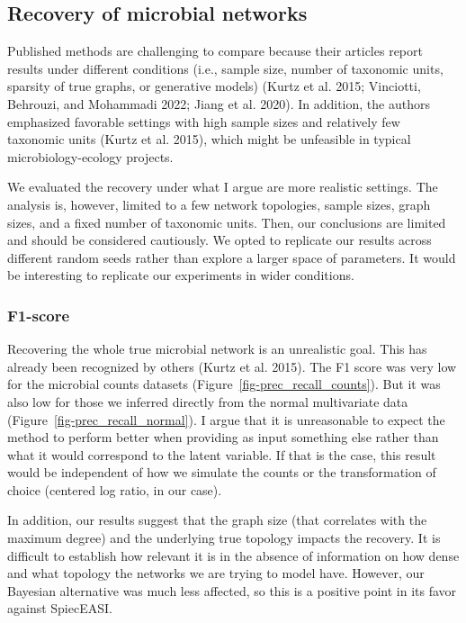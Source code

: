 \documentclass[
  a4paper,
]{article}
\begin{document}
\hypertarget{recovery-of-microbial-networks-1}{%
\subsection{Recovery of microbial
networks}\label{recovery-of-microbial-networks-1}}

Published methods are challenging to compare because their articles
report results under different conditions (i.e., sample size, number of
taxonomic units, sparsity of true graphs, or generative models) (Kurtz
et al. 2015; Vinciotti, Behrouzi, and Mohammadi 2022; Jiang et al.
2020). In addition, the authors emphasized favorable settings with high
sample sizes and relatively few taxonomic units (Kurtz et al. 2015),
which might be unfeasible in typical microbiology-ecology projects.

We evaluated the recovery under what I argue are more realistic
settings. The analysis is, however, limited to a few network topologies,
sample sizes, graph sizes, and a fixed number of taxonomic units. Then,
our conclusions are limited and should be considered cautiously. We
opted to replicate our results across different random seeds rather than
explore a larger space of parameters. It would be interesting to
replicate our experiments in wider conditions.

\hypertarget{f1-score-1}{%
\subsubsection{F1-score}\label{f1-score-1}}

Recovering the whole true microbial network is an unrealistic goal. This
has already been recognized by others (Kurtz et al. 2015). The F1 score
was very low for the microbial counts datasets
(Figure~\ref{fig-prec_recall_counts}). But it was also low for those we
inferred directly from the normal multivariate data
(Figure~\ref{fig-prec_recall_normal}). I argue that it is unreasonable
to expect the method to perform better when providing as input something
else rather than what it would correspond to the latent variable. If
that is the case, this result would be independent of how we simulate
the counts or the transformation of choice (centered log ratio, in our
case).

In addition, our results suggest that the graph size (that correlates
with the maximum degree) and the underlying true topology impacts the
recovery. It is difficult to establish how relevant it is in the absence
of information on how dense and what topology the networks we are trying
to model have. However, our Bayesian alternative was much less affected,
so this is a positive point in its favor against SpiecEASI.
\end{document}
